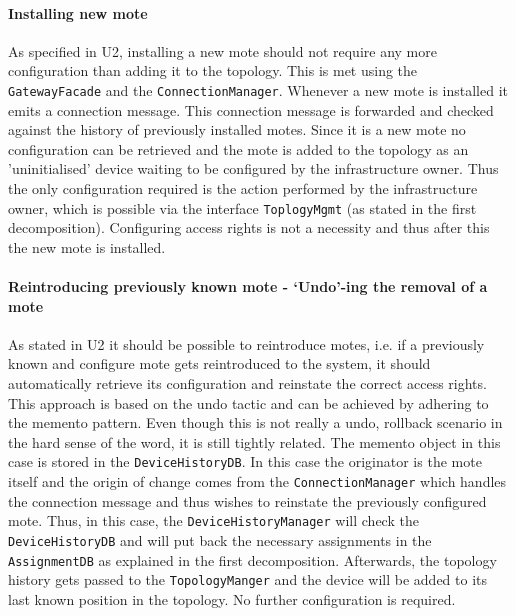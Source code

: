 \documentclass[english]{sareport}
\begin{document}
\paragraph{Installing new mote} 
As specified in U2, installing a new mote should not require any more configuration than adding it to the topology. This is met using the \texttt{GatewayFacade} and the \texttt{ConnectionManager}. Whenever a new mote is installed it emits a connection message. This connection message is forwarded and checked against the history of previously installed motes. Since it is a new mote no configuration can be retrieved and the mote is added to the topology as an 'uninitialised' device waiting to be configured by the infrastructure owner. Thus the only configuration required is the action performed by the infrastructure owner, which is possible via the interface \texttt{ToplogyMgmt} (as stated in the first decomposition). Configuring access rights is not a necessity and thus after this the new mote is installed.

\paragraph{Reintroducing previously known mote - `Undo'-ing the removal of a mote}
As stated in U2 it should be possible to reintroduce motes, i.e. if a previously known and configure mote gets reintroduced to the system, it should automatically retrieve its configuration and reinstate the correct access rights. This approach is based on the undo tactic and can be achieved by adhering to the memento pattern. Even though this is not really a undo, rollback scenario in the hard sense of the word, it is still tightly related. The memento object in this case is stored in the \texttt{DeviceHistoryDB}. In this case the originator is the mote itself and the origin of change comes from the \texttt{ConnectionManager} which handles the connection message and thus wishes to reinstate the previously configured mote. Thus, in this case, the \texttt{DeviceHistoryManager} will check the \texttt{DeviceHistoryDB} and will put back the necessary assignments in the \texttt{AssignmentDB} as explained in the first decomposition. Afterwards, the topology history gets passed to the \texttt{TopologyManger} and the device will be added to its last known position in the topology. No further configuration is required.
\end{document}
